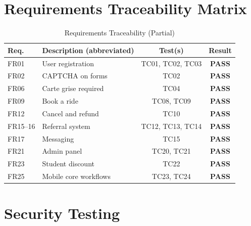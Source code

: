 \documentclass[12pt,a4paper,openright]{report}
\begin{document}
\section{Requirements Traceability Matrix}

\begin{table}[H]
\centering
\caption{Requirements Traceability (Partial)}
\label{tab:traceability}
\begin{tabularx}{\textwidth}{l X c c}
\toprule
\textbf{Req.} & \textbf{Description (abbreviated)} & \textbf{Test(s)} & \textbf{Result} \\
\midrule
FR01 & User registration & TC01, TC02, TC03 & \textcolor{green!70!black}{\textbf{PASS}} \\
FR02 & CAPTCHA on forms & TC02 & \textcolor{green!70!black}{\textbf{PASS}} \\
FR06 & Carte grise required & TC04 & \textcolor{green!70!black}{\textbf{PASS}} \\
FR09 & Book a ride & TC08, TC09 & \textcolor{green!70!black}{\textbf{PASS}} \\
FR12 & Cancel and refund & TC10 & \textcolor{green!70!black}{\textbf{PASS}} \\
FR15--16 & Referral system & TC12, TC13, TC14 & \textcolor{green!70!black}{\textbf{PASS}} \\
FR17 & Messaging & TC15 & \textcolor{green!70!black}{\textbf{PASS}} \\
FR21 & Admin panel & TC20, TC21 & \textcolor{green!70!black}{\textbf{PASS}} \\
FR23 & Student discount & TC22 & \textcolor{green!70!black}{\textbf{PASS}} \\
FR25 & Mobile core workflows & TC23, TC24 & \textcolor{green!70!black}{\textbf{PASS}} \\
\bottomrule
\end{tabularx}
\end{table}

\section{Security Testing}
\end{document}
